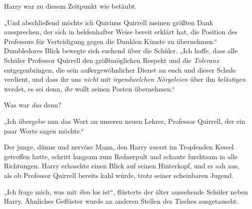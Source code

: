 Harry war zu diesem Zeitpunkt wie betäubt.

„Und abschließend möchte ich Quirinus Quirrell meinen größten Dank aussprechen, der sich in heldenhafter Weise bereit erklärt hat, die Position des Professors für Verteidigung gegen die Dunklen Künste zu übernehmen.“ Dumbledores Blick bewegte sich suchend über die Schüler.
„Ich hoffe, dass alle Schüler Professor Quirrell den größtmöglichen Respekt und die \emph{Toleranz} entgegenbringen, die sein außergewöhnlicher Dienst an euch und dieser Schule verdient, und dass ihr uns \emph{nicht} mit \emph{irgendwelchen Nörgeleien} über ihn \emph{belästigen} werdet, es sei denn, \emph{ihr} wollt seinen Posten übernehmen.“

Was war \emph{das} denn?

„Ich übergebe nun das Wort an unseren neuen Lehrer, Professor Quirrell, der ein paar Worte sagen möchte.“

Der junge, dünne und nervöse Mann, den Harry zuerst im Tropfenden Kessel getroffen hatte, schritt langsam zum Rednerpult und schaute furchtsam in alle Richtungen. Harry erhaschte einen Blick auf seinen Hinterkopf, und es sah aus, als ob Professor Quirrell bereits kahl würde, trotz seiner scheinbaren Jugend.

„Ich frage mich, was mit \emph{ihm} los ist“, flüsterte der älter aussehende Schüler neben Harry. Ähnliches Geflüster wurde an anderen Stellen des Tisches ausgetauscht.

